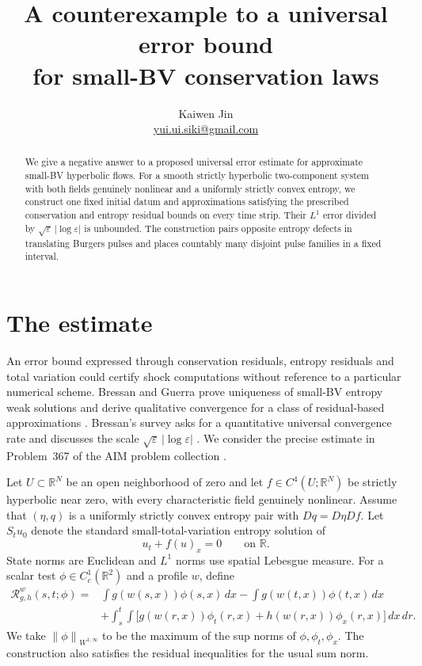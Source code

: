\documentclass[11pt]{article}
\title{A counterexample to a universal error bound\\for small-BV conservation laws}
\author{Kaiwen Jin\\\small\href{mailto:yui.ui.siki@gmail.com}{yui.ui.siki@gmail.com}}
\date{}
\newcommand{\R}{\mathbb R}
\newcommand{\Res}{\mathcal R}
\newcommand{\norm}[1]{\left\|#1\right\|}
\begin{document}
\maketitle

\begin{abstract}
We give a negative answer to a proposed universal error estimate for approximate small-BV hyperbolic flows. For a smooth strictly hyperbolic two-component system with both fields genuinely nonlinear and a uniformly strictly convex entropy, we construct one fixed initial datum and approximations satisfying the prescribed conservation and entropy residual bounds on every time strip. Their $L^1$ error divided by $\sqrt\varepsilon\,|\log\varepsilon|$ is unbounded. The construction pairs opposite entropy defects in translating Burgers pulses and places countably many disjoint pulse families in a fixed interval.
\end{abstract}

\section{The estimate}

An error bound expressed through conservation residuals, entropy residuals and total variation could certify shock computations without reference to a particular numerical scheme. Bressan and Guerra prove uniqueness of small-BV entropy weak solutions and derive qualitative convergence for a class of residual-based approximations \cite[Theorem~1.1 and Corollary~4.1]{BG}. Bressan's survey asks for a quantitative universal convergence rate and discusses the scale $\sqrt\varepsilon\,|\log\varepsilon|$ \cite[Section~7, Open Problem~3]{B}. We consider the precise estimate in Problem~367 of the AIM problem collection \cite{AIM}.

Let $U\subset\R^N$ be an open neighborhood of zero and let $f\in C^4(U;\R^N)$ be strictly hyperbolic near zero, with every characteristic field genuinely nonlinear. Assume that $(\eta,q)$ is a uniformly strictly convex entropy pair with $Dq=D\eta Df$. Let $S_tu_0$ denote the standard small-total-variation entropy solution of
\[
 u_t+f(u)_x=0\qquad\text{on }\R.
\]
State norms are Euclidean and $L^1$ norms use spatial Lebesgue measure. For a scalar test $\phi\in C_c^1(\R^2)$ and a profile $w$, define
\begin{equation}\label{eq:residual}
\begin{split}
 \Res^w_{g,h}(s,t;\phi)={}&\int g(w(s,x))\phi(s,x)\,dx
 -\int g(w(t,x))\phi(t,x)\,dx\\
 &+\int_s^t\!\int\bigl[g(w(r,x))\phi_t(r,x)
                  +h(w(r,x))\phi_x(r,x)\bigr]\,dx\,dr.
\end{split}
\end{equation}
We take $\norm{\phi}_{W^{1,\infty}}$ to be the maximum of the sup norms of $\phi,\phi_t,\phi_x$. The construction also satisfies the residual inequalities for the usual sum norm.
\end{document}
